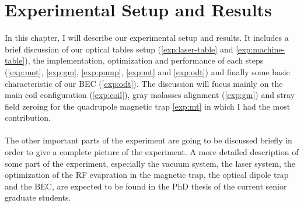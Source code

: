 \chapter{Experimental Setup and Results}

In this chapter, I will describe our experimental setup and results. It includes a brief discussion of our optical tables setup (\ref{exp:laser-table} and \ref{exp:machine-table}), the implementation, optimization and performance of each steps (\ref{exp:mot}, \ref{exp:gm}, \ref{exp:pump}, \ref{exp:mt} and \ref{exp:odt}) and finally some basic characteristic of our BEC (\ref{exp:odt}). The discussion will fucus mainly on the main coil configuration (\ref{exp:coil}), gray molasses alignment (\ref{exp:gm}) and stray field zeroing for the quadrupole magnetic trap \ref{exp:mt} in which I had the most contribution.\\
\\
The other important parts of the experiment are going to be discussed briefly in order to give a complete picture of the experiment. A more detailed description of some part of the experiment, especially the vacuum system, the laser system, the optimization of the RF evapration in the magnetic trap, the optical dipole trap and the BEC, are expected to be found in the PhD thesis of the current senior graduate students.


